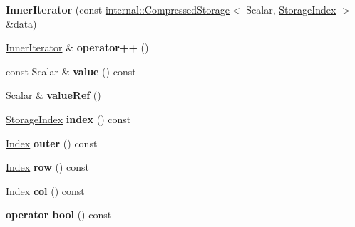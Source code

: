 \begin{DoxyCompactItemize}
{\bfseries Inner\+Iterator} (const \mbox{\hyperlink{class_eigen_1_1internal_1_1_compressed_storage}{internal\+::\+Compressed\+Storage}}$<$ Scalar, \mbox{\hyperlink{class_eigen_1_1_sparse_matrix_base_a0b540ba724726ebe953f8c0df06081ed}{Storage\+Index}} $>$ \&data)
\item 
\mbox{\label{class_eigen_1_1_sparse_compressed_base_1_1_inner_iterator_a53b6f9da87142b9a9a21bd76bd5c979f}} 
\mbox{\hyperlink{class_eigen_1_1_sparse_compressed_base_1_1_inner_iterator}{Inner\+Iterator}} \& {\bfseries operator++} ()
\item 
\mbox{\label{class_eigen_1_1_sparse_compressed_base_1_1_inner_iterator_a2fc15f9f1f5e666058d1748a362f5b7e}} 
const Scalar \& {\bfseries value} () const
\item 
\mbox{\label{class_eigen_1_1_sparse_compressed_base_1_1_inner_iterator_a12591f854eb2a95878ce773311c8be6e}} 
Scalar \& {\bfseries value\+Ref} ()
\item 
\mbox{\label{class_eigen_1_1_sparse_compressed_base_1_1_inner_iterator_a6ef22bc379f3f097e6df4879387af016}} 
\mbox{\hyperlink{class_eigen_1_1_sparse_matrix_base_a0b540ba724726ebe953f8c0df06081ed}{Storage\+Index}} {\bfseries index} () const
\item 
\mbox{\label{class_eigen_1_1_sparse_compressed_base_1_1_inner_iterator_aea781dab34ddd442e99fa9333563d321}} 
\mbox{\hyperlink{struct_eigen_1_1_eigen_base_a554f30542cc2316add4b1ea0a492ff02}{Index}} {\bfseries outer} () const
\item 
\mbox{\label{class_eigen_1_1_sparse_compressed_base_1_1_inner_iterator_aa6c057b16cbad7f91c9dd0a999473f12}} 
\mbox{\hyperlink{struct_eigen_1_1_eigen_base_a554f30542cc2316add4b1ea0a492ff02}{Index}} {\bfseries row} () const
\item 
\mbox{\label{class_eigen_1_1_sparse_compressed_base_1_1_inner_iterator_a4ea945a666c9ef67022d2ba40526f11a}} 
\mbox{\hyperlink{struct_eigen_1_1_eigen_base_a554f30542cc2316add4b1ea0a492ff02}{Index}} {\bfseries col} () const
\item 
\mbox{\label{class_eigen_1_1_sparse_compressed_base_1_1_inner_iterator_a9d4cce010afa10873d8e3ef9ac550c58}} 
{\bfseries operator bool} () const
\end{DoxyCompactItemize}
